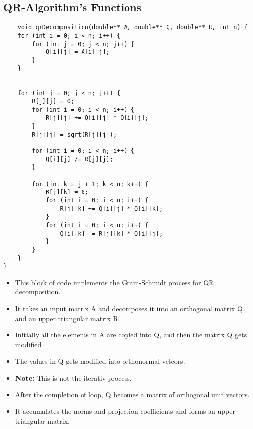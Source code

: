 \documentclass{article}
\begin{document}
\subsection{QR-Algorithm's Functions}
\begin{lstlisting}
    void qrDecomposition(double** A, double** Q, double** R, int n) {
    for (int i = 0; i < n; i++) {
        for (int j = 0; j < n; j++) {
            Q[i][j] = A[i][j];
        }
    }


    for (int j = 0; j < n; j++) {
        R[j][j] = 0;
        for (int i = 0; i < n; i++) {
            R[j][j] += Q[i][j] * Q[i][j];
        }
        R[j][j] = sqrt(R[j][j]);
        
        for (int i = 0; i < n; i++) {
            Q[i][j] /= R[j][j];
        }
        
        for (int k = j + 1; k < n; k++) {
            R[j][k] = 0;
            for (int i = 0; i < n; i++) {
                R[j][k] += Q[i][j] * Q[i][k];
            }
            for (int i = 0; i < n; i++) {
                Q[i][k] -= R[j][k] * Q[i][j];
            }
        }
    }
}
\end{lstlisting}
\begin{itemize}
\item This block of code implements the Gram-Schmidt process for QR decomposition.
\item It takes an input matrix A and decomposes it into an orthogonal matrix Q and an upper triangular matrix R.
\item Initially all the elements in A are copied into Q, and then the matrix Q gets modified.
\item The values in Q gets modified into orthonormal vetcors.
\item \textbf{Note:} This is not the iterativ process.
\item After the completion of loop, Q becomes a matrix of orthogonal unit vectors.
\item  R accumulates the norms and projection coefficients and forms an upper triangular matrix.
\end{itemize}
\newpage
\end{document}
